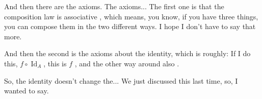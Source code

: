 \begin{speech}[00:02:53 - 00:03:45]
And then there are the axioms. The axioms...  The first one is that the composition law is associative , which means, you know, if you have three things, you can compose them in the two different ways. I hope I don't have to say that more.

And then the second is the axioms about the identity, which is roughly: If I do this, $f \circ \operatorname{Id}_A$, this is $f$ , and the other way around also .

So, the identity doesn't change the... We just discussed this last time, so, I wanted to say.
\end{speech}

